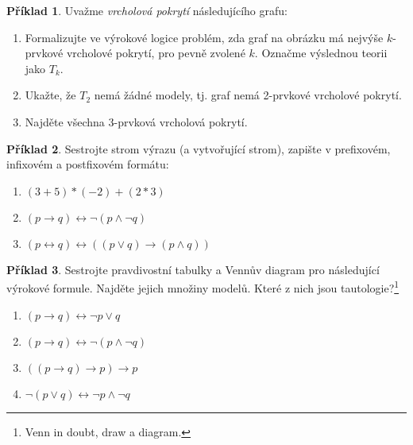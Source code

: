\documentclass[a4paper]{article}
\theoremstyle{definition}
\newtheorem{problem}{Příklad}
\begin{document}
\medskip\begin{problem}
Uvažme \emph{vrcholová pokrytí} následujícího grafu:
\begin{center}
\end{center}
\begin{enumerate}
    \item Formalizujte ve výrokové logice problém, zda graf na obrázku má nejvýše $k$-prvkové vrcholové pokrytí, pro pevně zvolené $k$. Označme výslednou teorii jako $T_k$.
    \item Ukažte, že $T_2$ nemá žádné modely, tj. graf nemá 2-prvkové vrcholové pokrytí.
    \item Najděte všechna 3-prvková vrcholová pokrytí.
\end{enumerate}
\end{problem}


\medskip\begin{problem}
    Sestrojte strom výrazu (a vytvořující strom), zapište v prefixovém, infixovém a postfixovém formátu:
    \begin{enumerate}
        \item $(3+5)*(-2)+(2*3)$
        \item $(p \to q) \leftrightarrow \neg (p \wedge \neg q)$
        \item $(p \leftrightarrow q) \leftrightarrow ((p \vee q) \to (p \wedge q))$
    \end{enumerate}
\end{problem}


\medskip\begin{problem}
Sestrojte pravdivostní tabulky a Vennův diagram pro následující výrokové formule. Najděte jejich množiny modelů. Které z nich jsou tautologie?\footnote{Venn in doubt, draw a diagram.}
\begin{enumerate}
\item $(p \to q) \leftrightarrow \neg p \vee q$
\item $(p \to q) \leftrightarrow \neg (p \wedge \neg q)$
\item $((p\to q)\to p)\to p$
\item $\neg (p\vee q)\leftrightarrow \neg p\wedge \neg q$
\end{enumerate}
\end{problem}
\end{document}
